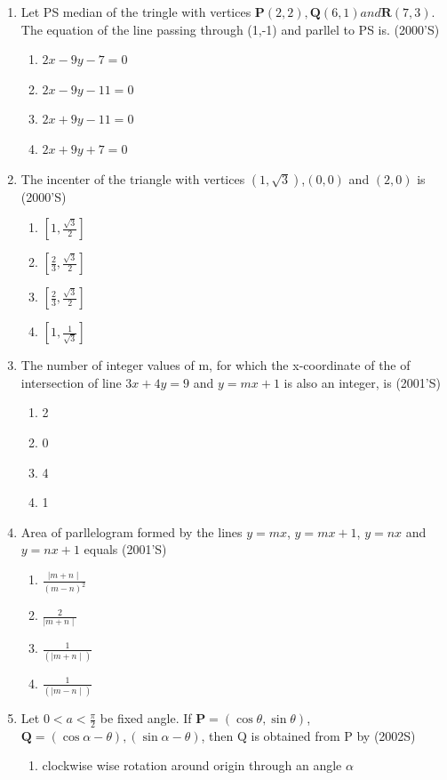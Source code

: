 \documentclass[12pt]{article}
\providecommand{\sbrak}[1]{\ensuremath{{}\left[#1\right]}}
\let\vec\mathbf
\begin{document}
\begin{enumerate}
\begin{enumerate}
\end{enumerate}
\item Let PS median of the tringle with vertices $\vec{P}(2,2), \vec{Q}(6,1) and \vec{R}(7,3)$. The equation of the line passing through (1,-1) and parllel to PS is. (2000'S)
\begin{enumerate}
\item $2x-9y-7=0$ 
\item $2x-9y-11=0$ 
\item $2x+9y-11=0$
\item $2x+9y+7=0$
\end{enumerate}
\item The incenter of the triangle with vertices $(1,\sqrt{3})$,$(0,0)$ and $(2,0)$ is (2000'S)
\begin{enumerate}
\item $\sbrak{1,\frac{\sqrt{3}}{2}}$ 
\item $\sbrak{\frac{2}{3},\frac{\sqrt{3}}{2}}$ 
\item $\sbrak{\frac{2}{3},\frac{\sqrt{3}}{2}}$ 
\item $\sbrak{1,\frac{1}{{\sqrt{3}}}}$
\end{enumerate}
\item The number of integer values of m, for which the x-coordinate of the of intersection of line $3x+4y=9$ and $y=mx+1$ is also an integer, is (2001'S)
\begin{enumerate}
\item 2 
\item 0 
\item 4   
\item 1
\end{enumerate}
\item Area of parllelogram formed by the lines $y=mx$, $y=mx+1$, $y=nx$ and $y=nx+1$ equals (2001'S)
\begin{enumerate}
\item $\frac{\mid m+n\mid}{(m-n)^2}$
\item $\frac{2}{\mid m+n \mid}$
\item $\frac{1}{(\mid m+n \mid)}$
\item $\frac{1}{(\mid m-n\mid)}$
\end{enumerate}
\item Let $0<a<\frac{\pi}{2}$ be fixed angle. If $\vec{P}=(\cos\theta,\sin\theta)$, $\vec{Q}=(\cos\alpha-\theta),(\sin\alpha-\theta)$, then Q is obtained from P by (2002S)
\begin{enumerate}
\item clockwise wise rotation around origin through an angle $\alpha$

\end{enumerate}
\end{enumerate}
\end{document}
